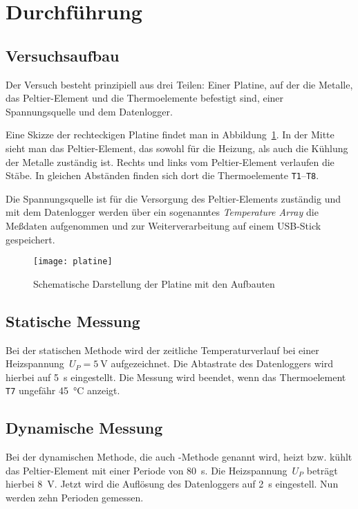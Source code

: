 
\section{Durchführung}

\subsection{Versuchsaufbau}

Der Versuch besteht prinzipiell aus drei Teilen: Einer Platine, auf der
die Metalle, das Peltier-Element und die Thermoelemente befestigt sind,
einer Spannungsquelle und dem Datenlogger.

Eine Skizze der rechteckigen Platine findet man in
Abbildung~\ref{fig:platine}. In der Mitte sieht man das Peltier-Element,
das sowohl für die Heizung, als auch die Kühlung der Metalle zuständig
ist. Rechts und links vom Peltier-Element verlaufen die Stäbe. In
gleichen Abständen finden sich dort die Thermoelemente
\texttt{T1}--\texttt{T8}.

Die Spannungsquelle ist für die Versorgung des Peltier-Elements
zuständig und mit dem Datenlogger werden über ein sogenanntes
\emph{Temperature Array} die Meßdaten aufgenommen und zur
Weiterverarbeitung auf einem USB-Stick gespeichert.

\begin{figure}
  \centering
  \texttt{[image: platine]}
  \caption{Schematische Darstellung der Platine mit den Aufbauten}
  \label{fig:platine}
\end{figure}

\subsection{Statische Messung}

Bei der statischen Methode wird der zeitliche Temperaturverlauf bei
einer Heizspannung~$U_P = \SI{5}{\volt}$ aufgezeichnet. Die Abtastrate
des Datenloggers wird hierbei auf \SI{5}{\second} eingestellt. Die
Messung wird beendet, wenn das Thermoelement \texttt{T7} ungefähr
\SI{45}{\degreeCelsius} anzeigt.

\subsection{Dynamische Messung}

Bei der dynamischen Methode, die auch -Methode genannt
wird, heizt bzw. kühlt das Peltier-Element mit einer Periode von
\SI{80}{s}. Die Heizspannung~$U_P$ beträgt hierbei \SI{8}{\volt}. Jetzt
wird die Auflösung des Datenloggers auf \SI{2}{\second} eingestell. Nun
werden zehn Perioden gemessen.
